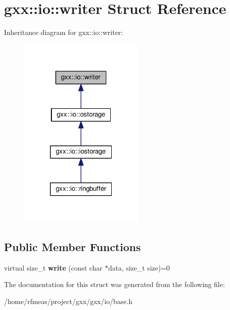 \hypertarget{structgxx_1_1io_1_1writer}{}\section{gxx\+:\+:io\+:\+:writer Struct Reference}
\label{structgxx_1_1io_1_1writer}


Inheritance diagram for gxx\+:\+:io\+:\+:writer\+:
\nopagebreak
\begin{figure}[H]
\begin{center}
\leavevmode
\includegraphics[width=172pt]{structgxx_1_1io_1_1writer__inherit__graph}
\end{center}
\end{figure}
\subsection*{Public Member Functions}
\begin{DoxyCompactItemize}
\item 
virtual size\+\_\+t {\bfseries write} (const char $\ast$data, size\+\_\+t size)=0\hypertarget{structgxx_1_1io_1_1writer_ac3211fd45144a7452ed241c75dea0ab3}{}\label{structgxx_1_1io_1_1writer_ac3211fd45144a7452ed241c75dea0ab3}

\end{DoxyCompactItemize}


The documentation for this struct was generated from the following file\+:\begin{DoxyCompactItemize}
\item 
/home/rfmeas/project/gxx/gxx/io/base.\+h\end{DoxyCompactItemize}
